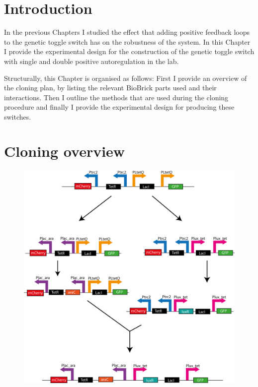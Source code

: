
\section{Introduction}

In the previous Chapters I studied the effect that adding positive feedback loops to the genetic toggle switch has on the robustness of the system. In this Chapter I provide the experimental design for the construction of the genetic toggle switch with single and double positive autoregulation in the lab. 

Structurally, this Chapter is organised as follows: First I provide an overview of the cloning plan, by listing the relevant BioBrick parts used and their interactions. Then I outline the methods that are used during the cloning procedure and finally I provide the experimental design for producing these switches.


\section{Cloning overview}


\begin{figure}[t]
	\begin{center}
		\includegraphics[scale=0.7]{../../chapters/chapterDesignSwitches/images/switches_cloning_big.png}
		\caption[LoF caption]{\label{fig:plan}}
	\end{center}
\end{figure}
\clearpage

